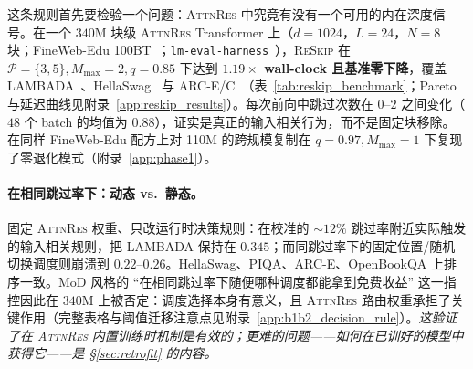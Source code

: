 \documentclass{article}
\newcommand{\attnres}{\textsc{AttnRes}}
\newcommand{\reskip}{\textsc{ReSkip}}
\begin{document}
这条规则首先要检验一个问题：\attnres{} 中究竟有没有一个可用的内在深度信号。在一个 $340$M 块级 \attnres{} Transformer 上（$d{=}1024$，$L{=}24$，$N{=}8$ 块；FineWeb-Edu 100BT~\citep{penedo2024fineweb}；\texttt{lm-eval-harness}~\citep{eval-harness}），\reskip{} 在 $\mathcal{P}{=}\{3,5\}, M_{\max}{=}2, q{=}0.85$ 下达到 \textbf{$1.19\times$ wall-clock 且基准零下降}，覆盖 LAMBADA~\citep{paperno2016lambada}、HellaSwag~\citep{zellers2019hellaswag} 与 ARC-E/C~\citep{clark2018arc}（表~\ref{tab:reskip_benchmark}；Pareto 与延迟曲线见附录~\ref{app:reskip_results}）。每次前向中跳过次数在 $0$--$2$ 之间变化（$48$ 个 batch 的均值为 $0.88$），证实是真正的输入相关行为，而不是固定块移除。在同样 FineWeb-Edu 配方上对 110M 的跨规模复制在 $q{=}0.97, M_{\max}{=}1$ 下复现了零退化模式（附录~\ref{app:phase1}）。

\paragraph{在相同跳过率下：动态 vs.\ 静态。} 固定 \attnres{} 权重、只改运行时决策规则：在校准的 $\sim$$12\%$ 跳过率附近实际触发的输入相关规则，把 LAMBADA 保持在 $0.345$；而同跳过率下的固定位置/随机切换调度则崩溃到 $0.22$--$0.26$。HellaSwag、PIQA、ARC-E、OpenBookQA 上排序一致。MoD 风格的 ``在相同跳过率下随便哪种调度都能拿到免费收益'' 这一指控因此在 $340$M 上被否定：调度选择本身有意义，且 \attnres{} 路由权重承担了关键作用（完整表格与阈值迁移注意点见附录~\ref{app:b1b2_decision_rule}）。\emph{这验证了在 \attnres{} 内置训练时机制是有效的；更难的问题——如何在已训好的模型中获得它——是 \S\ref{sec:retrofit} 的内容。}
\end{document}
